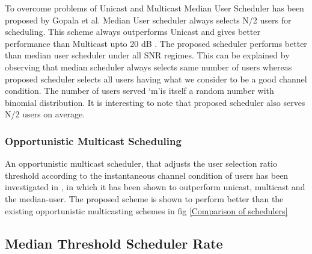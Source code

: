 \documentclass[conference]{IEEEtran}
\begin{document}
  To overcome problems of Unicast and Multicast Median User Scheduler has been proposed by Gopala et al. \cite{Praveenkumar_throuputdelay,Praveen_Kumar}
Median User scheduler always selects N/2 users for scheduling. This scheme always outperforms Unicast and gives better performance than Multicast upto 20 dB . The proposed scheduler performs better than median user scheduler under all SNR regimes. This can be explained by observing that median scheduler always selects same number of users whereas proposed scheduler selects all users having what we consider to be a good channel condition. The number of users served \textquoteleft m\textquoteright  is itself a random number with binomial distribution. It is interesting to note that proposed scheduler also serves N/2 users on average.

\subsubsection{Opportunistic Multicast Scheduling }

An opportunistic multicast scheduler, that adjusts the user selection ratio threshold according to the instantaneous channel condition of users has been investigated in \cite{OMS}, in which it has been shown to outperform unicast, multicast and the median-user. The proposed scheme is shown to perform better than the existing opportunistic multicasting schemes in fig \ref{Comparison of schedulers}

\subsection{Median Threshold Scheduler Rate}
\end{document}
